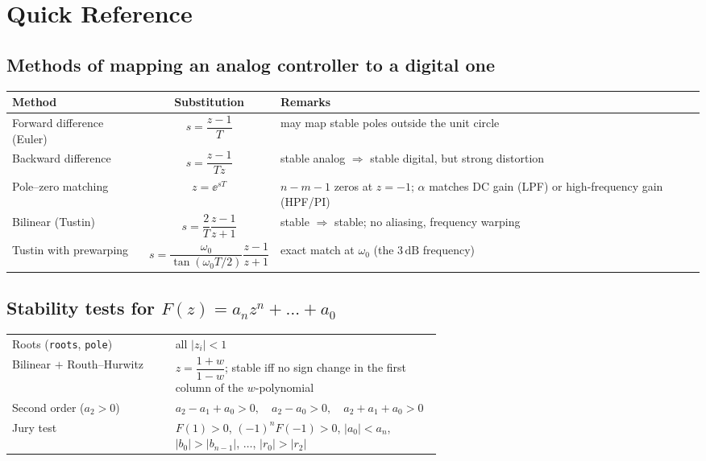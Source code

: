 \appendix
\section{Quick Reference}\label{app:reference}

\subsection*{Methods of mapping an analog controller to a digital one}
\begin{center}
\renewcommand{\arraystretch}{1.6}
\small\begin{tabularx}{\linewidth}{@{}l c X@{}}
\textbf{Method} & \textbf{Substitution} & \textbf{Remarks}\\\hline
Forward difference (Euler) & $s=\dfrac{z-1}{T}$ & may map stable poles outside the unit circle\\
Backward difference & $s=\dfrac{z-1}{Tz}$ & stable analog $\Rightarrow$ stable digital, but strong distortion\\
Pole--zero matching & $z=\ee^{sT}$ & $n-m-1$ zeros at $z=-1$; $\alpha$ matches DC gain (LPF) or high-frequency gain (HPF/PI)\\
Bilinear (Tustin) & $s=\dfrac2T\dfrac{z-1}{z+1}$ & stable $\Rightarrow$ stable; no aliasing, frequency warping\\
Tustin with prewarping & $s=\dfrac{\omega_0}{\tan(\omega_0T/2)}\dfrac{z-1}{z+1}$ & exact match at $\omega_0$ (the $3\,\mathrm{dB}$ frequency)
\end{tabularx}
\end{center}

\subsection*{Stability tests for $F(z)=a_nz^{n}+\dots+a_0$}
\begin{center}
\renewcommand{\arraystretch}{1.5}
\begin{tabular}{@{}l p{0.62\linewidth}@{}}
Roots (\texttt{roots}, \texttt{pole}) & all $|z_i|<1$\\
Bilinear $+$ Routh--Hurwitz & $z=\dfrac{1+w}{1-w}$; stable iff no sign change in the first column of the $w$-polynomial\\
Second order ($a_2>0$) & $a_2-a_1+a_0>0,\quad a_2-a_0>0,\quad a_2+a_1+a_0>0$\\
Jury test & $F(1)>0$, $(-1)^{n}F(-1)>0$, $|a_0|<a_n$, $|b_0|>|b_{n-1}|$, $\dots$, $|r_0|>|r_2|$
\end{tabular}
\end{center}

